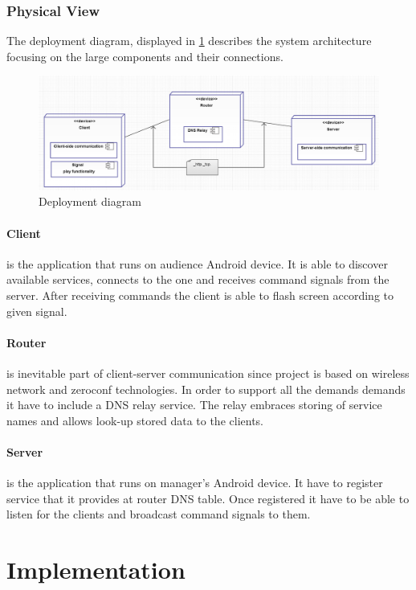\subsubsection{Physical View}
The deployment diagram, displayed in \ref{fig:deployment_diagram } describes the system architecture focusing on the large components and their connections.

\begin{figure}[H]
	\centering
		\includegraphics[width=15cm]{sprint1/deploy_diagram.png}
	\caption{Deployment diagram}
	\label{fig:deployment_diagram }
\end{figure}

\paragraph{Client}
is the application that runs on audience Android device. It is able to discover available services, connects to the one and receives command signals from the server. After receiving commands the client is able to flash screen according to given signal.

\paragraph{Router}
is inevitable part of client-server communication since project is based on wireless network and zeroconf technologies. In order to support all the demands demands it have to include a DNS relay service. The relay embraces storing of service names and allows look-up stored data to the clients.

\paragraph{Server}
is the application that runs on manager's Android device. It have to register service that it provides at router DNS table. Once registered it have to be able to listen for the clients and broadcast command signals to them.


\section{Implementation}

